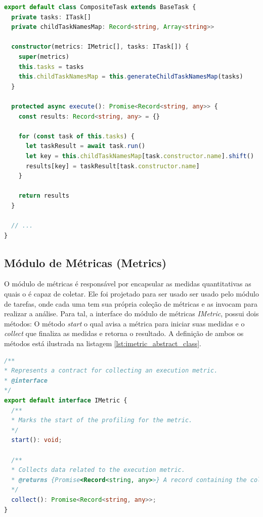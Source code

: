 \documentclass[12pt]{tcc}
\begin{document}
\begin{lstlisting}[label={lst:compositetask_class}, caption={Fragmento de código da classe \emph{CompositeTask}, fundamental na implementação do padrão de projeto composite \ref{subsection:composite}.}, language=TypeScript, breaklines=true]
export default class CompositeTask extends BaseTask {
  private tasks: ITask[]
  private childTaskNamesMap: Record<string, Array<string>>

  constructor(metrics: IMetric[], tasks: ITask[]) {
    super(metrics)
    this.tasks = tasks
    this.childTaskNamesMap = this.generateChildTaskNamesMap(tasks)
  }

  protected async execute(): Promise<Record<string, any>> {
    const results: Record<string, any> = {}

    for (const task of this.tasks) {
      let taskResult = await task.run()
      let key = this.childTaskNamesMap[task.constructor.name].shift() || task.constructor.name
      results[key] = taskResult[task.constructor.name]
    }

    return results
  }

  // ...
}

\end{lstlisting}


	\subsection{Módulo de Métricas (Metrics)}
	\label{subsection:modulo-metrics}

	O módulo de métricas é responsável por encapsular as medidas quantitativas as quais o  é capaz de coletar.
	Ele foi projetado para ser usado ser usado pelo módulo de tarefas,
	onde cada uma tem sua própria coleção de métricas e as invocam para realizar a análise.
	Para tal, a interface do módulo de métricas \emph{IMetric}, possui dois métodos: O método \emph{start} o qual avisa a métrica para iniciar suas medidas e o \emph{collect} que finaliza as medidas e retorna o resultado.
	A definição de ambos os métodos está ilustrada na listagem \ref{lst:imetric_abstract_class}.

\begin{lstlisting}[label={lst:imetric_abstract_class}, caption={Implementação da classe responsável por representar uma métrica.}, language=TypeScript, breaklines=true]
/**
* Represents a contract for collecting an execution metric.
* @interface
*/
export default interface IMetric {
  /**
  * Marks the start of the profiling for the metric.
  */
  start(): void;

  /**
  * Collects data related to the execution metric.
  * @returns {Promise<Record<string, any>>} A record containing the collected metric data.
  */
  collect(): Promise<Record<string, any>>;
}
\end{lstlisting}
\end{document}
